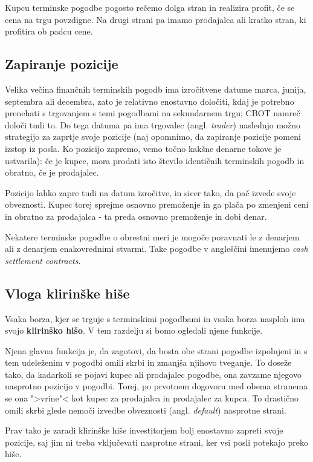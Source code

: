\documentclass[a4paper]{article}
\begin{document}
Kupcu terminske pogodbe pogosto rečemo dolga stran in realizira profit, če se cena na trgu 
povzdigne. Na drugi strani pa imamo prodajalca ali kratko stran, ki profitira ob padcu cene.

\subsection{Zapiranje pozicije}
Velika večina finančnih terminskih pogodb ima izročitvene datume marca, junija, septembra ali 
decembra, zato je relativno enostavno določiti, kdaj je potrebno prenehati s trgovanjem s temi 
pogodbami na sekundarnem trgu; CBOT namreč določi tudi to. Do tega datuma pa ima trgovalec 
(angl. \textit{trader}) naslednjo možno strategijo za zaprtje svoje pozicije (naj opomnimo, da 
zapiranje pozicije pomeni izstop iz posla. Ko pozicijo zapremo, vemo točno kakšne denarne 
tokove je ustvarila): če je kupec, mora prodati isto število identičnih terminskih pogodb in 
obratno, če je prodajalec.

Pozicijo lahko zapre tudi na datum izročitve, in sicer tako, da pač izvede svoje obveznosti. 
Kupec torej sprejme osnovno premoženje in ga plača po zmenjeni ceni in obratno za prodajalca - 
ta preda osnovno premoženje in dobi denar. 

Nekatere terminske pogodbe o obrestni meri je mogoče poravnati le z denarjem ali z denarjem 
enakovrednimi stvarmi. Take pogodbe v angleščini imenujemo \textit{cash settlement contracts}.

\subsection{Vloga klirinške hiše}
Vsaka borza, kjer se trguje s terminskimi pogodbami in vsaka borza nasploh ima svojo \textbf{
klirinško hišo}. V tem razdelju si bomo ogledali njene funkcije.

Njena glavna funkcija je, da zagotovi, da bosta obe strani pogodbe izpolnjeni in s tem 
udeleženim v pogodbi omili skrbi in zmanjša njihovo tveganje. To doseže tako, da kadarkoli
se pojavi kupec ali prodajalec pogodbe, ona zavzame njegovo nasprotno pozicijo v pogodbi.
Torej, po prvotnem dogovoru med obema stranema se ona ">vrine"< kot kupec za prodajalca in 
prodajalec za kupca. To drastično omili skrbi glede nemoči izvedbe obveznosti (angl. 
\textit{default}) nasprotne strani. 

Prav tako je zaradi klirinške hiše investitorjem bolj enostavno zapreti svoje pozicije, saj 
jim ni treba vključevati nasprotne strani, ker vsi posli potekajo preko hiše. 
\end{document}
